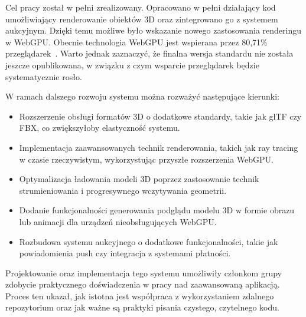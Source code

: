 Cel pracy został w pełni zrealizowany. Opracowano w pełni działający kod umożliwiający renderowanie obiektów 3D oraz zintegrowano go z systemem aukcyjnym. Dzięki temu możliwe było wskazanie nowego zastosowania renderingu w WebGPU. Obecnie technologia WebGPU jest wspierana przez 80,71\% przeglądarek~\cite{caniuse-webgpu}. Warto jednak zaznaczyć, że finalna wersja standardu nie została jeszcze opublikowana, w związku z czym wsparcie przeglądarek będzie systematycznie rosło.

W ramach dalszego rozwoju systemu można rozważyć następujące kierunki:
\begin{itemize}
  \item Rozszerzenie obsługi formatów 3D o dodatkowe standardy, takie jak glTF czy FBX, co zwiększyłoby elastyczność systemu.
  \item Implementacja zaawansowanych technik renderowania, takich jak ray tracing w czasie rzeczywistym, wykorzystując przyszłe rozszerzenia WebGPU.
  \item Optymalizacja ładowania modeli 3D poprzez zastosowanie technik strumieniowania i progresywnego wczytywania geometrii.
  \item Dodanie funkcjonalności generowania podglądu modelu 3D w formie obrazu lub animacji dla urządzeń nieobsługujących WebGPU.
  \item Rozbudowa systemu aukcyjnego o dodatkowe funkcjonalności, takie jak powiadomienia push czy integracja z systemami płatności.
\end{itemize}

Projektowanie oraz implementacja tego systemu umożliwiły członkom grupy zdobycie praktycznego doświadczenia w pracy nad zaawansowaną aplikacją. Proces ten ukazał, jak istotna jest współpraca z wykorzystaniem zdalnego repozytorium oraz jak ważne są praktyki pisania czystego, czytelnego kodu.